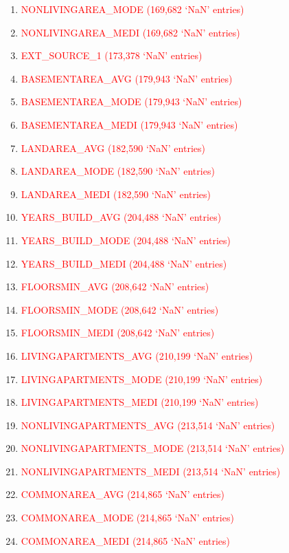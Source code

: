 \documentclass[12pt, letterpaper]{article}
\begin{document}
\begin{appendices}
\begin{enumerate}
 \item \textcolor{red}{NONLIVINGAREA_MODE (169,682 `NaN' entries)}
 \item \textcolor{red}{NONLIVINGAREA_MEDI (169,682 `NaN' entries)}
 \item \textcolor{red}{EXT_SOURCE_1 (173,378 `NaN' entries)}
 \item \textcolor{red}{BASEMENTAREA_AVG (179,943 `NaN' entries)}
 \item \textcolor{red}{BASEMENTAREA_MODE (179,943 `NaN' entries)}
 \item \textcolor{red}{BASEMENTAREA_MEDI (179,943 `NaN' entries)}
 \item \textcolor{red}{LANDAREA_AVG (182,590 `NaN' entries)}
 \item \textcolor{red}{LANDAREA_MODE (182,590 `NaN' entries)}
 \item \textcolor{red}{LANDAREA_MEDI (182,590 `NaN' entries)}
 \item \textcolor{red}{YEARS_BUILD_AVG (204,488 `NaN' entries)}
 \item \textcolor{red}{YEARS_BUILD_MODE (204,488 `NaN' entries)}
 \item \textcolor{red}{YEARS_BUILD_MEDI (204,488 `NaN' entries)}
 \item \textcolor{red}{FLOORSMIN_AVG (208,642 `NaN' entries)}
 \item \textcolor{red}{FLOORSMIN_MODE (208,642 `NaN' entries)}
 \item \textcolor{red}{FLOORSMIN_MEDI (208,642 `NaN' entries)}
 \item \textcolor{red}{LIVINGAPARTMENTS_AVG (210,199 `NaN' entries)}
 \item \textcolor{red}{LIVINGAPARTMENTS_MODE (210,199 `NaN' entries)}
 \item \textcolor{red}{LIVINGAPARTMENTS_MEDI (210,199 `NaN' entries)}
 \item \textcolor{red}{NONLIVINGAPARTMENTS_AVG (213,514 `NaN' entries)}
 \item \textcolor{red}{NONLIVINGAPARTMENTS_MODE (213,514 `NaN' entries)}
 \item \textcolor{red}{NONLIVINGAPARTMENTS_MEDI (213,514 `NaN' entries)}
 \item \textcolor{red}{COMMONAREA_AVG (214,865 `NaN' entries)}
 \item \textcolor{red}{COMMONAREA_MODE (214,865 `NaN' entries)}
 \item \textcolor{red}{COMMONAREA_MEDI (214,865 `NaN' entries)}
\end{enumerate}
\normalsize


\end{appendices}
\end{document}
